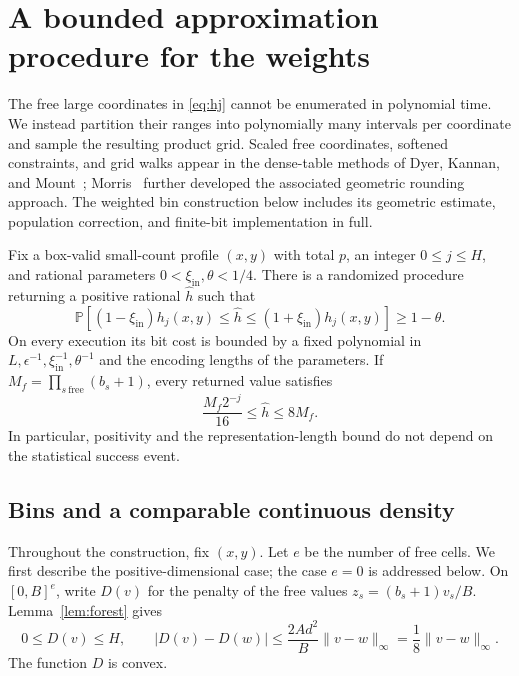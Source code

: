 \section{A bounded approximation procedure for the weights}
\label{sec:evaluation}

The free large coordinates in \eqref{eq:hj} cannot be enumerated in
polynomial time.  We instead partition their ranges into polynomially
many intervals per coordinate and sample the resulting product grid.
Scaled free coordinates, softened constraints, and grid walks appear
in the dense-table methods of Dyer, Kannan, and Mount~\cite{DKM1997};
Morris~\cite{Morris2002} further developed the associated geometric
rounding approach. The weighted bin construction below includes its
geometric estimate, population correction, and finite-bit
implementation in full.

\begin{samepage}
\begin{proposition}
\label{prop:weight-oracle}
Fix a box-valid small-count profile $(x,y)$ with total $p$, an integer
$0\le j\le H$, and rational parameters
$0<\xi_{\mathrm{in}},\theta<1/4$.  There is a randomized procedure
returning a positive rational $\widehat h$ such that
\[
 \mathbb P\left[
  (1-\xi_{\mathrm{in}})h_j(x,y)\le\widehat h
       \le(1+\xi_{\mathrm{in}})h_j(x,y)
 \right]\ge1-\theta.
\]
On every execution its bit cost is bounded by a fixed polynomial in
$L,\epsilon^{-1},\xi_{\mathrm{in}}^{-1},\theta^{-1}$ and the encoding
lengths of the parameters.  If
$M_f=\prod_{s\ \mathrm{free}}(b_s+1)$, every returned value satisfies
\begin{equation}
 \frac{M_f2^{-j}}{16}\le\widehat h\le8M_f.
 \label{eq:oracle-unconditional-range}
\end{equation}
In particular, positivity and the representation-length bound do not
depend on the statistical success event.
\end{proposition}
\end{samepage}

\subsection{Bins and a comparable continuous density}

Throughout the construction, fix $(x,y)$.  Let $e$ be the number of free
cells.  We first describe the positive-dimensional case; the case $e=0$
is addressed below.  On $[0,B]^e$, write $D(v)$ for the penalty of the
free values $z_s=(b_s+1)v_s/B$.  Lemma~\ref{lem:forest} gives
\begin{equation}
 0\le D(v)\le H,
 \qquad
 |D(v)-D(w)|\le\frac{2Ad^2}{B}\|v-w\|_\infty
                   =\frac18\|v-w\|_\infty.
 \label{eq:scaled-penalty-bounds}
\end{equation}
The function $D$ is convex.

